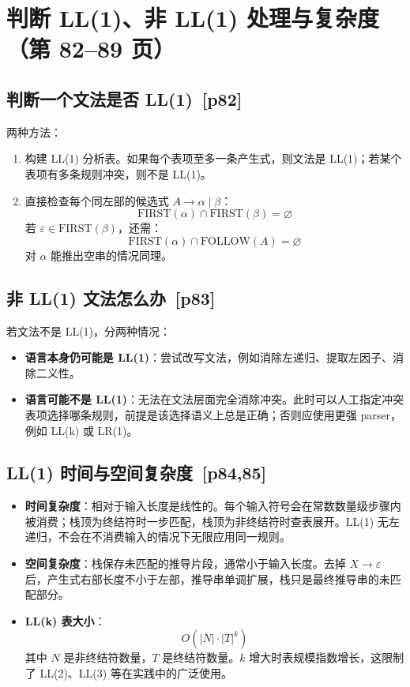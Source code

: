 \documentclass[UTF8,fontset=none,11pt]{ctexart}
\newcommand{\pg}[1]{\texorpdfstring{{\small\color{graytext}\,[p#1]}}{ [p#1]}}
\newcommand{\eps}{\varepsilon}
\begin{document}
\section{判断 LL(1)、非 LL(1) 处理与复杂度（第 82--89 页）}

\subsection{判断一个文法是否 LL(1) \pg{82}}
两种方法：
\begin{enumerate}
  \item 构建 LL(1) 分析表。如果每个表项至多一条产生式，则文法是 LL(1)；若某个表项有多条规则冲突，则不是 LL(1)。
  \item 直接检查每个同左部的候选式 \(A\to\alpha\mid\beta\)：
  \[
  \mathrm{FIRST}(\alpha)\cap\mathrm{FIRST}(\beta)=\varnothing
  \]
  若 \(\eps\in\mathrm{FIRST}(\beta)\)，还需：
  \[
  \mathrm{FIRST}(\alpha)\cap\mathrm{FOLLOW}(A)=\varnothing
  \]
  对 \(\alpha\) 能推出空串的情况同理。
\end{enumerate}

\subsection{非 LL(1) 文法怎么办 \pg{83}}
若文法不是 LL(1)，分两种情况：

\begin{itemize}
  \item \textbf{语言本身仍可能是 LL(1)}：尝试改写文法，例如消除左递归、提取左因子、消除二义性。
  \item \textbf{语言可能不是 LL(1)}：无法在文法层面完全消除冲突。此时可以人工指定冲突表项选择哪条规则，前提是该选择语义上总是正确；否则应使用更强 parser，例如 LL(k) 或 LR(1)。
\end{itemize}

\subsection{LL(1) 时间与空间复杂度 \pg{84,85}}
\begin{itemize}
  \item \textbf{时间复杂度}：相对于输入长度是线性的。每个输入符号会在常数数量级步骤内被消费；栈顶为终结符时一步匹配，栈顶为非终结符时查表展开。LL(1) 无左递归，不会在不消费输入的情况下无限应用同一规则。
  \item \textbf{空间复杂度}：栈保存未匹配的推导片段，通常小于输入长度。去掉 \(X\to\eps\) 后，产生式右部长度不小于左部，推导串单调扩展，栈只是最终推导串的未匹配部分。
  \item \textbf{LL(k) 表大小}：
  \[
  O(|N|\cdot |T|^k)
  \]
  其中 \(N\) 是非终结符数量，\(T\) 是终结符数量。\(k\) 增大时表规模指数增长，这限制了 LL(2)、LL(3) 等在实践中的广泛使用。
\end{itemize}
\end{document}
